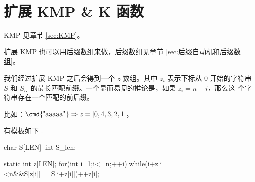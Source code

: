\section{扩展 KMP \& K 函数} \label{sec:扩展KMP}
KMP 见章节 \ref{sec:KMP}。

扩展 KMP 也可以用后缀数组来做，后缀数组见章节 \ref{sec:后缀自动机和后缀数组}。

我们经过扩展 KMP 之后会得到一个 $z$ 数组。其中 $z_i$ 表示下标从 $0$ 开始的字符串
$S$ 和 $S_{i:}$ 的最长匹配前缀。一个显而易见的推论是，如果 $z_i = n - i$，那么这
个字符串存在一个匹配的前后缀。

比如：$\text{\cmd{"aaaaa"}} \Rightarrow z = [0, 4, 3, 2, 1]$。

有模板如下：
\begin{Cpp}
{
  char S[LEN];
  int S_len;

  static int z[LEN];
  for(int i=1;i<=n;++i){
    while(i+z[i]<n&&S[z[i]]==S[i+z[i]])++z[i];
  }
}
\end{Cpp}

